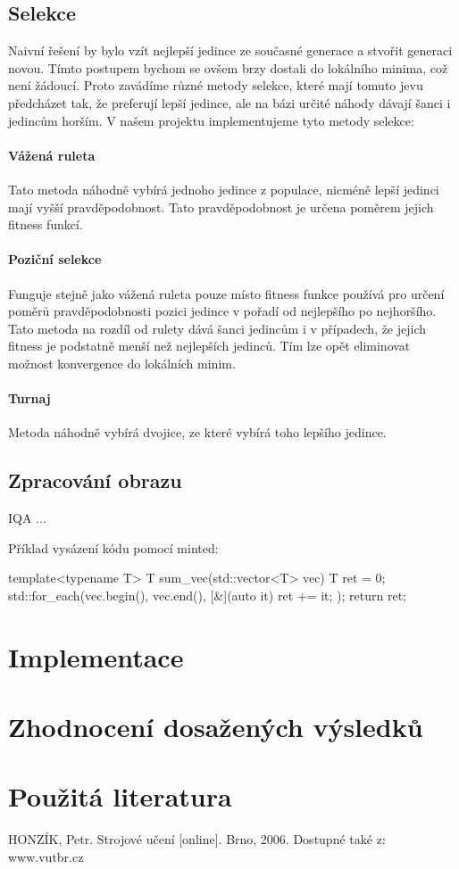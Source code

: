 \documentclass[a4paper,11pt]{scrartcl}
\begin{document}
\subsection{Selekce}
Naivní řešení by bylo vzít nejlepší jedince ze současné generace a stvořit generaci novou. Tímto postupem bychom se ovšem brzy dostali do lokálního minima, což není žádoucí. Proto zavádíme různé metody selekce, které mají tomuto jevu předcházet tak, že preferují lepší jedince, ale na bázi určité náhody dávají šanci i jedincům horším. V našem projektu implementujeme tyto metody selekce:

\paragraph{Vážená ruleta}
Tato metoda náhodně vybírá jednoho jedince z populace, nicméně lepší jedinci mají vyšší pravděpodobnost. Tato pravděpodobnost je určena poměrem jejich fitness funkcí.

\paragraph{Poziční selekce}
Funguje stejně jako vážená ruleta pouze místo fitness funkce používá pro určení poměrů pravděpodobnosti pozici jedince v pořadí od nejlepšího po nejhoršího. Tato metoda na rozdíl od rulety dává šanci jedincům i v případech, že jejich fitness je podstatně menší než nejlepších jedinců. Tím lze opět eliminovat možnost konvergence do lokálních minim.

\paragraph{Turnaj}
Metoda náhodně vybírá dvojice, ze které vybírá toho lepšího jedince.

\subsection{Zpracování obrazu}

IQA ...

Příklad vysázení kódu pomocí minted:
\begin{cppcode}
template<typename T>
T sum_vec(std::vector<T> vec) {
    T ret = 0;
    std::for_each(vec.begin(), vec.end(), [&](auto it) { ret += it; });
    return ret;
}
\end{cppcode}

\section{Implementace}

\section{Zhodnocení dosažených výsledků}


\section{Použitá literatura}

HONZÍK, Petr. Strojové učení [online]. Brno, 2006. Dostupné také z: www.vutbr.cz
\end{document}
